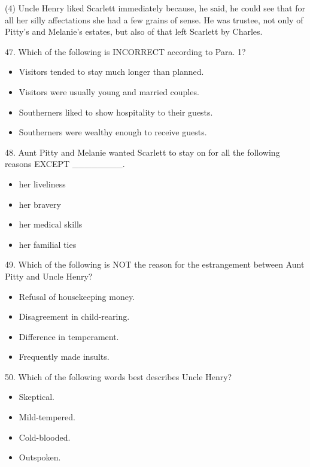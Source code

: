 \documentclass[UTF8,11pt]{ctexart}
\begin{document}
(4) Uncle Henry liked Scarlett immediately because, he said, he could see that for all her silly affectations she had a few grains of sense. He was trustee, not only of Pitty’s and Melanie’s estates, but also of that left Scarlett by Charles.


47. Which of the following is INCORRECT according to Para. 1?


\begin{itemize}[leftmargin=2em,itemsep=.2em,topsep=.4em]\item[A.] Visitors tended to stay much longer than planned.
\item[B.] Visitors were usually young and married couples.
\item[C.] Southerners liked to show hospitality to their guests.
\item[D.] Southerners were wealthy enough to receive guests.
\end{itemize}

48. Aunt Pitty and Melanie wanted Scarlett to stay on for all the following reasons EXCEPT \_\_\_\_\_\_\_\_.


\begin{itemize}[leftmargin=2em,itemsep=.2em,topsep=.4em]\item[A.] her liveliness
\item[B.] her bravery
\item[C.] her medical skills
\item[D.] her familial ties
\end{itemize}

49. Which of the following is NOT the reason for the estrangement between Aunt Pitty and Uncle Henry?


\begin{itemize}[leftmargin=2em,itemsep=.2em,topsep=.4em]\item[A.] Refusal of housekeeping money.
\item[B.] Disagreement in child-rearing.
\item[C.] Difference in temperament.
\item[D.] Frequently made insults.
\end{itemize}

50. Which of the following words best describes Uncle Henry?


\begin{itemize}[leftmargin=2em,itemsep=.2em,topsep=.4em]\item[A.] Skeptical.
\item[B.] Mild-tempered.
\item[C.] Cold-blooded.
\item[D.] Outspoken.
\end{itemize}
\end{document}
